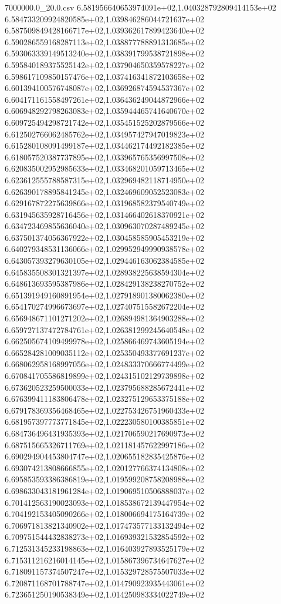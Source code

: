 \begin{filecontents*}{7000000.0_20.0.csv}
6.581956640653974091e+02,1.040328792809414153e+02
6.584733209924820585e+02,1.039846286044721637e+02
6.587509849428166717e+02,1.039362617899423640e+02
6.590286559168287113e+02,1.038877788891313685e+02
6.593063339149513240e+02,1.038391799538721898e+02
6.595840189375525142e+02,1.037904650359578227e+02
6.598617109850157476e+02,1.037416341872103658e+02
6.601394100576748087e+02,1.036926874594537367e+02
6.604171161558497261e+02,1.036436249044872966e+02
6.606948292798263083e+02,1.035944465741640670e+02
6.609725494298721742e+02,1.035451525202879566e+02
6.612502766062485762e+02,1.034957427947019823e+02
6.615280108091499187e+02,1.034462174492182385e+02
6.618057520387737895e+02,1.033965765356997508e+02
6.620835002952985633e+02,1.033468201059713465e+02
6.623612555788587315e+02,1.032969482118714950e+02
6.626390178895841245e+02,1.032469609052523083e+02
6.629167872275639866e+02,1.031968582379540749e+02
6.631945635928716456e+02,1.031466402618370921e+02
6.634723469855636040e+02,1.030963070287489245e+02
6.637501374056367922e+02,1.030458585905453219e+02
6.640279348531136066e+02,1.029952949990938578e+02
6.643057393279630105e+02,1.029446163062384585e+02
6.645835508301321397e+02,1.028938225638594304e+02
6.648613693595387986e+02,1.028429138238270752e+02
6.651391949160891954e+02,1.027918901380062380e+02
6.654170274996673697e+02,1.027407515582672204e+02
6.656948671101271202e+02,1.026894981364903288e+02
6.659727137472784761e+02,1.026381299245640548e+02
6.662505674109499978e+02,1.025866469743605194e+02
6.665284281009035112e+02,1.025350493377691237e+02
6.668062958168997056e+02,1.024833370666774499e+02
6.670841705586819899e+02,1.024315102129739898e+02
6.673620523259500033e+02,1.023795688285672441e+02
6.676399411183806478e+02,1.023275129653375188e+02
6.679178369356468465e+02,1.022753426751960433e+02
6.681957397773771845e+02,1.022230580100385851e+02
6.684736496431935393e+02,1.021706590217690973e+02
6.687515665326711769e+02,1.021181457622997186e+02
6.690294904453804747e+02,1.020655182835425876e+02
6.693074213808666855e+02,1.020127766374134808e+02
6.695853593386386819e+02,1.019599208758208988e+02
6.698633043181961284e+02,1.019069510506888037e+02
6.701412563190023093e+02,1.018538672139447954e+02
6.704192153405090266e+02,1.018006694175164739e+02
6.706971813821340902e+02,1.017473577133132494e+02
6.709751544432838273e+02,1.016939321532854592e+02
6.712531345233198863e+02,1.016403927893525179e+02
6.715311216216014145e+02,1.015867396734647627e+02
6.718091157374507247e+02,1.015329728575507033e+02
6.720871168701788747e+02,1.014790923935443061e+02
6.723651250190538349e+02,1.014250983334022749e+02

\end{filecontents*}
